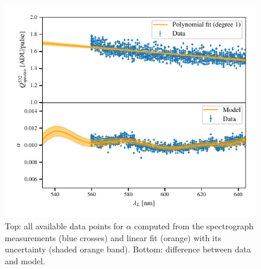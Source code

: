 \begin{figure}[h]
    \centering
    \includegraphics[width=\columnwidth]{fig/alpha_532_qswMAX.pdf}
    \caption{Top: all available data points for $\alpha$ computed from the spectrograph measurements (blue crosses) and linear fit (orange) with its uncertainty (shaded orange band). Bottom: difference between data and model.}
    \label{fig:alpha_532}
\end{figure}

